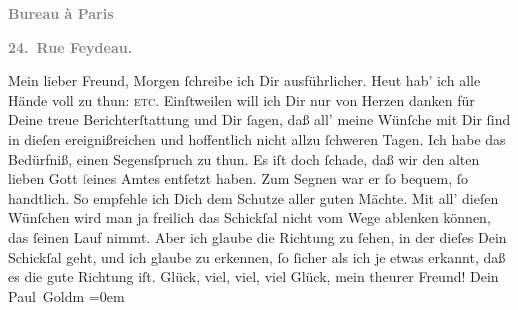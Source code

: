 \begin{ledgroupsized}[t]{13cm}
           \pstart
           \begin{otherlanguage}{french}\textcolor{gray}{\textbf{\textbf{Bureau à Paris}}}\end{otherlanguage}\pend
           \pstart
           \begin{otherlanguage}{french}\textcolor{gray}{\textbf{\textbf{24. Rue Feydeau.}}}\end{otherlanguage}\pend
           \pstart\center{}Mein lieber Freund,\pend\pstart
           Morgen ſchreibe ich Dir ausführlicher. Heut hab’ ich alle Hände voll zu thun: \label{K_L02749-1v}\label{K_L02749-1h}{ }\textsc{etc}. Einſtweilen will ich Dir nur von Herzen danken für
               Deine treue Berichterſtattung und Dir ſagen, daß 
               all’ meine Wünſche mit Dir ſind in dieſen {\pb}ereignißreichen und hoffentlich nicht allzu ſchweren Tagen. Ich habe das Bedürfniß,
               einen Segensſpruch zu thun. Es iſt doch ſchade, daß \strikeout{\textcolor{gray}{n}} wir den alten lieben Gott \textcolor{gray}{ſ}eines  Amtes entſetzt haben. Zum Segnen war er ſo bequem, ſo handtlich. So
               empfehle ich Dich dem Schutze aller guten Mächte. Mit all’ dieſen Wünſchen wird man
               ja freilich {\pb}das Schickſal nicht vom Wege ablenken
               können, das ſeinen Lauf nimmt. Aber ich glaube die Richtung zu ſehen, in der dieſes
               Dein Schickſal geht, und ich glaube zu erkennen, ſo ſicher als ich je etwas erkannt,
               daß es die gute Richtung iſt.\pend
           \pstart
           Glück, viel, viel, viel Glück, mein theurer Freund!\pend
           \pstart
           Dein {\\[\baselineskip]}\spacefill\mbox{Paul Goldm\textcolor{gray}{{\geminationn}}}\pend
           \leftskip=0em{}
         
         \endnumbering{}\end{ledgroupsized}  \newcommand{\dateiname}{L02749}\newcommand{\titel}{Paul Goldmann an Arthur Schnitzler, 6. 10. [1895]}\newcommand{\editorInnen}{Martin Anton Müller und Laura Untner}
      